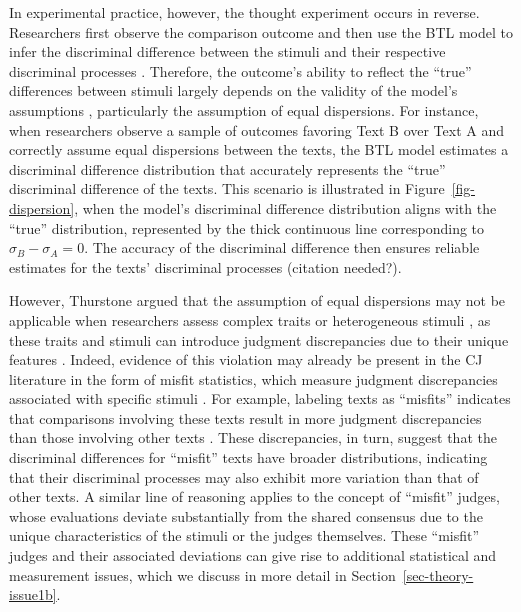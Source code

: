 \documentclass[
  authoryear,
  review,
  1p]{elsarticle}
\begin{document}
In experimental practice, however, the thought experiment occurs in
reverse. Researchers first observe the comparison outcome and then use
the BTL model to infer the discriminal difference between the stimuli
and their respective discriminal processes
\citep[pp.~373]{Thurstone_1927a}. Therefore, the outcome's ability to
reflect the ``true'' differences between stimuli largely depends on the
validity of the model's assumptions \citep[pp.~150]{Kohler_et_al_2019},
particularly the assumption of equal dispersions. For instance, when
researchers observe a sample of outcomes favoring Text B over Text A and
correctly assume equal dispersions between the texts, the BTL model
estimates a discriminal difference distribution that accurately
represents the ``true'' discriminal difference of the texts. This
scenario is illustrated in Figure~\ref{fig-dispersion}, when the model's
discriminal difference distribution aligns with the ``true''
distribution, represented by the thick continuous line corresponding to
\(\sigma_{B}-\sigma_{A}=0\). The accuracy of the discriminal difference
then ensures reliable estimates for the texts' discriminal processes
{(citation needed?)}.

However, Thurstone argued that the assumption of equal dispersions may
not be applicable when researchers assess complex traits or
heterogeneous stimuli \citep[pp.~376]{Thurstone_1927a}, as these traits
and stimuli can introduce judgment discrepancies due to their unique
features
\citep{vanDaal_et_al_2016, Lesterhuis_2018, Chambers_et_al_2022}.
Indeed, evidence of this violation may already be present in the CJ
literature in the form of misfit statistics, which measure judgment
discrepancies associated with specific stimuli
\citetext{\citealp[pp.~12]{Pollitt_2004}; \citealp[pp.~20]{Goossens_et_al_2018}}.
For example, labeling texts as ``misfits'' indicates that comparisons
involving these texts result in more judgment discrepancies than those
involving other texts
\citep{Pollitt_2012a, Pollitt_2012b, vanDaal_et_al_2016, Goossens_et_al_2018}.
These discrepancies, in turn, suggest that the discriminal differences
for ``misfit'' texts have broader distributions, indicating that their
discriminal processes may also exhibit more variation than that of other
texts. A similar line of reasoning applies to the concept of ``misfit''
judges, whose evaluations deviate substantially from the shared
consensus due to the unique characteristics of the stimuli or the judges
themselves. These ``misfit'' judges and their associated deviations can
give rise to additional statistical and measurement issues, which we
discuss in more detail in Section~\ref{sec-theory-issue1b}.
\end{document}
